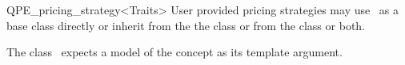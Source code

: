 \begin{ccRefClass}{QPE_pricing_strategy<Traits>}
User provided pricing strategies may use \ccRefName\ as a base class directly
or inherit from the the class  or from the class
 or both.   
   



\ccRequirements
\ccIndexRequirements

The class \ccRefName\ expects a model of the concept
 as its template argument.


\ccTypes \ccIndexClassTypes




\ccCreation
\ccIndexClassCreation
{}


\ccUnchecked

\ccAccessFunctions
\begin{ccIndexMemberFunctions}








\ccModifiers
{}



\end{ccIndexMemberFunctions}
\end{ccRefClass}
